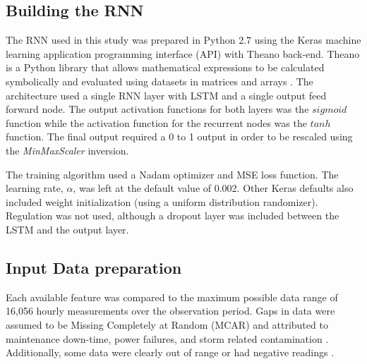 \begin{linenumbers}
\subsection{Building the RNN}
The RNN used in this study was prepared in Python 2.7 using the Keras machine learning application programming interface (API) \citep{keras2015} with Theano back-end. Theano is a Python library that allows mathematical expressions to be calculated symbolically and evaluated using datasets in matrices and arrays \citep{Al-Rfou2016}. The architecture used a single RNN layer with LSTM and a single output feed forward node. The output activation functions for both layers was the $sigmoid$ function while the activation function for the recurrent nodes was the $tanh$ function. The final output required a 0 to 1 output in order to be rescaled using the \emph{MinMaxScaler} inversion.

The training algorithm used a Nadam optimizer and MSE loss function. The learning rate, $\alpha$, was left at the default value of 0.002. Other Keras defaults also included weight initialization (using a uniform distribution randomizer). Regulation was not used, although a dropout layer was included between the LSTM and the output layer. 

\subsection{Input Data preparation}
Each available feature was compared to the maximum possible data range of 16,056 hourly measurements over the observation period. Gaps in data were assumed to be Missing Completely at Random (MCAR) and attributed to maintenance down-time, power failures, and storm related contamination \citep{Le2007}. Additionally, some data were clearly out of range or had negative readings \citep{Junger2015}.


\end{linenumbers}
